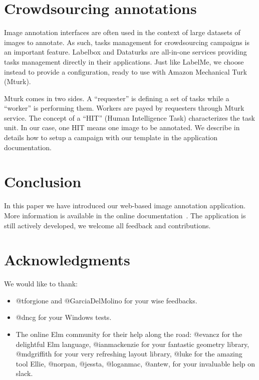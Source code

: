 \section{Crowdsourcing annotations}

Image annotation interfaces are often used in the context
of large datasets of images to annotate.
As such, tasks management for crowdsourcing campaigns is an important feature. 
Labelbox and Dataturks are all-in-one services providing
tasks management directly in their applications.
Just like LabelMe, we choose instead to provide a configuration,
ready to use with Amazon Mechanical Turk (Mturk).

Mturk comes in two sides. A ``requester'' is defining a set of tasks
while a ``worker'' is performing them.
Workers are payed by requesters through Mturk service.
The concept of a ``HIT'' (Human Intelligence Task) characterizes the task unit.
In our case, one HIT means one image to be annotated.
We describe in details how to setup a campaign with our template
in the application documentation.


\section{Conclusion}

In this paper we have introduced our web-based image annotation application.
More information is available in the online documentation~\cite{annotationappdoc}.
The application is still actively developed, we welcome all feedback and contributions.


\section{Acknowledgments}

We would like to thank:

\begin{itemize}
	\item @tforgione and @GarciaDelMolino for your wise feedbacks.
	\item @dncg for your Windows tests.
	\item The online Elm community for their help along the road:
		@evancz for the delightful Elm language,
		@ianmackenzie for your fantastic geometry library,
		@mdgriffith for your very refreshing layout library,
		@luke for the amazing tool Ellie,
		@norpan, @jessta, @loganmac, @antew, for your invaluable help on slack.
\end{itemize}
